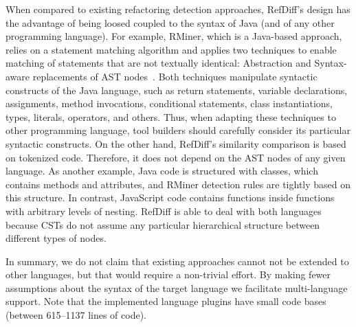 When compared to existing refactoring detection approaches, RefDiff's design has the advantage of being loosed coupled to the syntax of Java (and of any other programming language).
For example, RMiner, which is a Java-based approach, relies on a statement matching algorithm and applies two techniques to enable matching of statements that are not textually identical: Abstraction and Syntax-aware replacements of AST nodes~\cite{tsantalis2018rminer}.
Both techniques manipulate syntactic constructs of the Java language,
such as return statements, variable declarations, assignments, method invocations, conditional statements, class instantiations, types, literals, operators, and others. Thus, when adapting these techniques to other programming language, tool builders should carefully consider its particular syntactic constructs. On the other hand, RefDiff’s similarity comparison is based on tokenized code. Therefore, it does not depend on the AST nodes of any given language. 
As another example, Java code is structured with classes, which contains methods and attributes, and RMiner detection rules are tightly based on this structure. In contrast, JavaScript code contains functions inside functions with arbitrary levels of nesting. RefDiff is able to deal with both languages because CSTs do not assume any particular hierarchical structure between different types of nodes.

In summary, we do not claim that existing approaches cannot not be extended to other languages, but that would require a non-trivial effort.
By making fewer assumptions about the syntax of the target language we facilitate multi-language support. Note that the implemented language plugins have small code bases (between 615--1137 lines of code).
